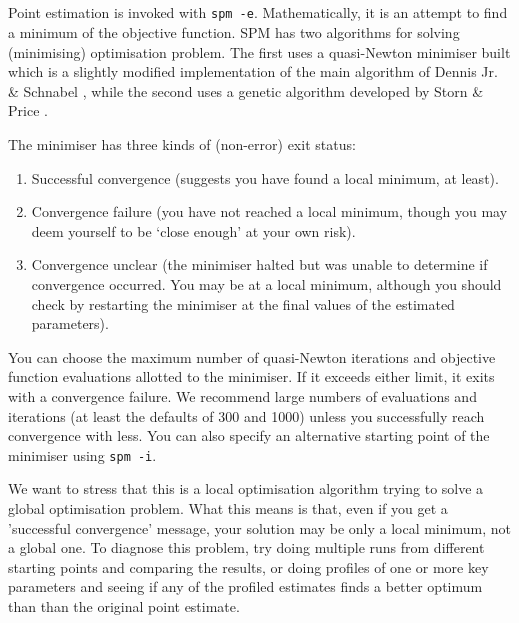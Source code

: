 \subsection{\label{sec:estimate-MPD}}

Point estimation is invoked with \texttt{spm -e}. Mathematically, it is an attempt to find a minimum of the objective function. SPM has two algorithms for solving (minimising) optimisation problem. The first uses a quasi-Newton minimiser built which is a slightly modified implementation of the main algorithm of Dennis Jr. \& Schnabel \citep{779}, while the second uses a genetic algorithm developed by Storn \& Price \citep{1442}.

The minimiser has three kinds of (non-error) exit status: 

\begin{enumerate}
\item Successful convergence (suggests you have found a local minimum, at least).
\item Convergence failure (you have not reached a local minimum, though you may deem yourself to be `close enough' at your own risk).
\item Convergence unclear (the minimiser halted but was unable to determine if convergence occurred. You may be at a local minimum, although you should check by restarting the minimiser at the final values of the estimated parameters).
\end{enumerate}

You can choose the maximum number of quasi-Newton iterations and objective function evaluations allotted to the minimiser. If it exceeds either limit, it exits with a convergence failure. We recommend large numbers of evaluations and iterations (at least the defaults of 300 and 1000) unless you successfully reach convergence with less. You can also specify an alternative starting point of the minimiser using \texttt{spm -i}.

We want to stress that this is a local optimisation algorithm trying to solve a global optimisation problem. What this means is that, even if you get a 'successful convergence' message, your solution may be only a local minimum, not a global one. To diagnose this problem, try doing multiple runs from different starting points and comparing the results, or doing profiles of one or more key parameters and seeing if any of the profiled estimates finds a better optimum than than the original point estimate.

